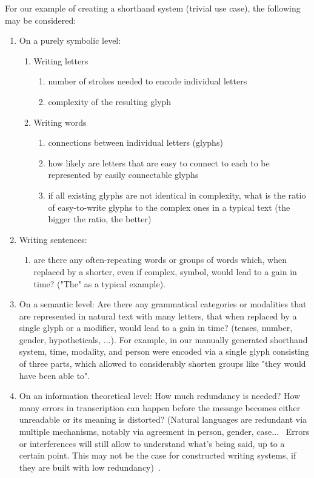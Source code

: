 \documentclass{vgtc}                          %
\begin{document}
For our example of creating a shorthand system (trivial use case), the following may be considered:
\begin{enumerate}
        \item On a purely symbolic level:
        \begin{enumerate}
                \item Writing letters
                \begin{enumerate}
                        \item number of strokes needed to encode individual letters
                        \item complexity of the resulting glyph
                \end{enumerate}
                \item Writing words
                \begin{enumerate}
                        \item connections between individual letters (glyphs)
                        \item how likely are letters that are easy to connect to each to be represented by easily connectable glyphs
                        \item if all existing glyphs are not identical in complexity, what is the ratio of easy-to-write glyphs to the complex ones in a typical text (the bigger the ratio, the better)
                \end{enumerate}
        \end{enumerate}
        \item Writing sentences:
        \begin{enumerate}
                \item are there any often-repeating words or groups of words which, when replaced by a shorter, even if complex, symbol, would lead to a gain in time? ("The" as a typical example).
        \end{enumerate}
        \item On a semantic level: Are there any grammatical categories or modalities that are represented in natural text with many letters, that when replaced by a single glyph or a modifier, would lead to a gain in time? (tenses, number, gender, hypotheticals, ...). For example, in our manually generated shorthand system, time, modality, and person were encoded via a single glyph consisting of three parts, which allowed to considerably shorten groups like "they would have been able to".
        \item On an information theoretical level: How much redundancy is needed? How many errors in transcription can happen before the message becomes either unreadable or its meaning is distorted?  (Natural languages  are redundant via multiple mechanisms, notably via agreement in person, gender, case...~\cite{bussmann2006routledge} Errors or interferences will still allow to understand what’s being said, up to a certain point. This may not be the case for constructed writing systems, if they are built with low redundancy)~\cite{reza1961introduction}.
\end{enumerate}
\end{document}
